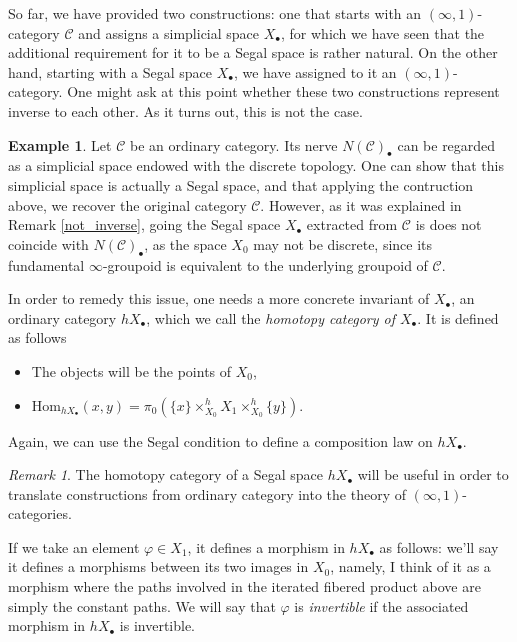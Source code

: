 \documentclass[a4paper,11pt]{article}
\newcommand{\Hom}{\mathrm{Hom}}
\newcommand{\ccal}{\mathcal{C}}
\theoremstyle{plain}
\theoremstyle{definition}
\newtheorem{ej}[thm]{Example}
\theoremstyle{remark}
\newtheorem*{rem}{Remark}
\begin{document}
So far, we have provided two constructions: one that starts with an $(\infty, 1)$-category $\ccal$ and assigns a simplicial space $X_{\bullet}$, for which we have seen that the additional requirement for it to be a Segal space is rather natural. On the other hand, starting with a Segal space $X_{\bullet}$, we have assigned to it an $(\infty, 1)$-category. One might ask at this point whether these two constructions represent inverse to each other. As it turns out, this is not the case. 

\begin{ej}
Let $\ccal$ be an ordinary category. Its nerve $N(\ccal)_{\bullet}$ can be regarded as a simplicial space endowed with the discrete topology. One can show that this simplicial space is actually a Segal space, and that applying the contruction above, we recover the original category $\ccal$. However, as it was explained in Remark \ref{not_inverse}, going the Segal space $X_{\bullet}$ extracted from $\ccal$ is does not coincide with $N(\ccal)_{\bullet}$, as the space $X_0$ may not be discrete, since its fundamental $\infty$-groupoid is equivalent to the underlying groupoid of $\ccal$. 
\end{ej}

In order to remedy this issue, one needs a more concrete invariant of $X_{\bullet}$, an ordinary category $hX_{\bullet}$, which we call the \textit{homotopy category of $X_{\bullet}$}. It is defined as follows





\begin{itemize}
    \item The objects will be the points of $X_0$, 
    \item $\Hom_{hX_{\bullet}}(x,y) = \pi_0(\{x\} \times_{X_0}^h X_1 \times^h_{X_0} \{y\})$. 
\end{itemize}

Again, we can use the Segal condition to define a composition law on $hX_{\bullet}$. 

\begin{rem}
The homotopy category of a Segal space $hX_{\bullet}$ will be useful in order to translate constructions from ordinary category into the theory of $(\infty, 1)$-categories. 
\end{rem}


If we take an element $\varphi \in X_1$, it defines a morphism in $h X_{\bullet}$ as follows: we'll say it defines a morphisms between its two images in $X_0$, namely, I think of it as a morphism where the paths involved in the iterated fibered product above are simply the constant paths.  We will say that $\varphi$ is \textit{invertible} if the associated morphism in $h X_{\bullet}$ is invertible.
\end{document}
